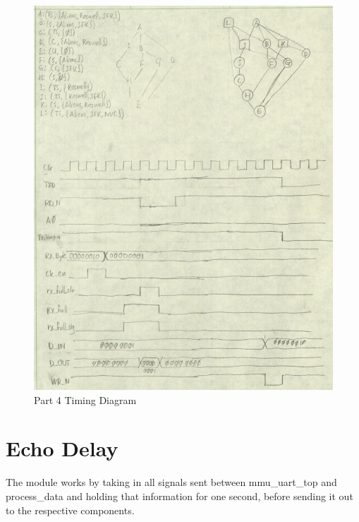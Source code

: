 \documentclass{article}
\begin{document}
	\begin{figure}[h]
		\begin{center}
			\includegraphics[scale=0.6]{../part4_files/part4_timing_diagram.png}
			\caption{Part 4 Timing Diagram}
		\end{center}
	\end{figure}


\section{Echo Delay}
The module works by taking in all signals sent between mmu\_uart\_top and process\_data and holding that information for one second, before sending it out to the respective components.
\end{document}
